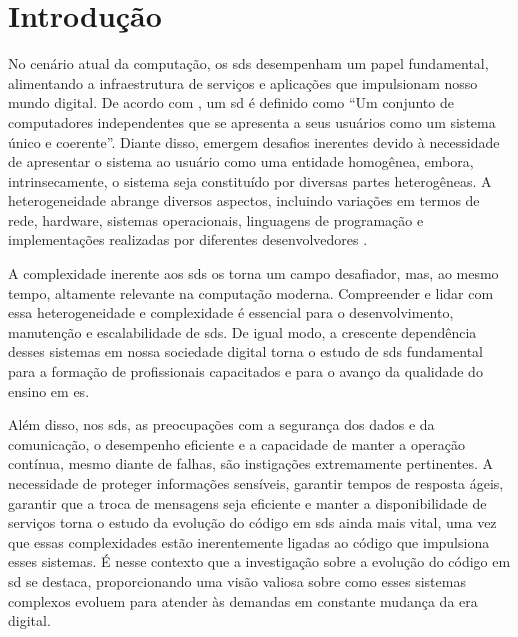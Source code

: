 

\chapter{Introdução}\label{cap:introducao}
No cenário atual da computação, os \gls{sds} desempenham um papel fundamental, alimentando a infraestrutura de serviços e aplicações que impulsionam nosso mundo digital. De acordo com , um \gls{sd} é definido como ``Um conjunto de computadores independentes que se apresenta a seus usuários como um sistema único e coerente''. Diante disso, emergem desafios inerentes devido à necessidade de apresentar o sistema ao usuário como uma entidade homogênea, embora, intrinsecamente, o sistema seja constituído por diversas partes heterogêneas. A heterogeneidade abrange diversos aspectos, incluindo variações em termos de rede, hardware, sistemas operacionais, linguagens de programação e implementações realizadas por diferentes desenvolvedores \cite{DistributedSystemsCoulouris}.

A complexidade inerente aos \gls{sds} os torna um campo desafiador, mas, ao mesmo tempo, altamente relevante na computação moderna. Compreender e lidar com essa heterogeneidade e complexidade é essencial para o desenvolvimento, manutenção e escalabilidade de \gls{sds}. De igual modo, a crescente dependência desses sistemas em nossa sociedade digital torna o estudo de \gls{sds} fundamental para a formação de profissionais capacitados e para o avanço da qualidade do ensino em \gls{es}.

Além disso, nos \gls{sds}, as preocupações com a segurança dos dados e da comunicação, o desempenho eficiente e a capacidade de manter a operação contínua, mesmo diante de falhas, são instigações extremamente pertinentes. A necessidade de proteger informações sensíveis, garantir tempos de resposta ágeis, garantir que a troca de mensagens seja eficiente e manter a disponibilidade de serviços torna o estudo da evolução do código em \gls{sds} ainda mais vital, uma vez que essas complexidades estão inerentemente ligadas ao código que impulsiona esses sistemas. É nesse contexto que a investigação sobre a evolução do código em \gls{sd} se destaca, proporcionando uma visão valiosa sobre como esses sistemas complexos evoluem para atender às demandas em constante mudança da era digital.

